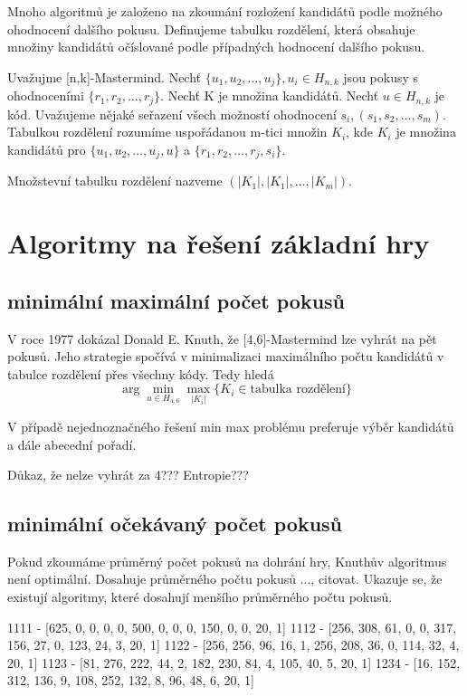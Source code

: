 Mnoho algoritmů je založeno na zkoumání rozložení kandidátů podle možného ohodnocení dalšího pokusu. Definujeme tabulku rozdělení, která obsahuje množiny kandidátů očíslované podle případných hodnocení dalšího pokusu. 
\begin{definice}\label{def01:2}
  Uvažujme [n,k]-Mastermind. \hfill \break Nechť $\{u_1, u_2, \dots, u_j\}, u_i \in H_{n,k}$ jsou pokusy s ohodnoceními $\{r_1, r_2, \dots, r_j\}$. Nechť K je množina kandidátů. Nechť $u \in H_{n,k}$ je kód. Uvažujeme nějaké seřazení všech možností ohodnocení $s_i, (s_1, s_2, \dots, s_m)$. Tabulkou rozdělení rozumíme uspořádanou m-tici množin $K_i$, kde $K_i$ je množina kandidátů pro $\{u_1, u_2, \dots, u_j, u\}$ a $\{r_1, r_2, \dots, r_j, s_i\}$.

  Množstevní tabulku rozdělení nazveme $(|K_1|, |K_1|, \dots, |K_m|)$.
\end{definice}



\section{Algoritmy na řešení základní hry}
\subsection{minimální maximální počet pokusů}
V roce 1977 dokázal Donald E. Knuth, že [4,6]-Mastermind lze vyhrát na pět pokusů.\cite{donald_e__knuth_1977} Jeho strategie spočívá v minimalizaci maximálního počtu kandidátů v tabulce rozdělení přes všechny kódy. Tedy hledá 
\[ \arg\min_{u \in H_{4,6}} \max_{|K_i|} \{ K_i \in \textrm{tabulka rozdělení}\} \]

V případě nejednoznačného řešení min max problému preferuje výběr kandidátů a dále abecední pořadí. 

Důkaz, že nelze vyhrát za 4??? Entropie???

\subsection{minimální očekávaný počet pokusů}
Pokud zkoumáme průměrný počet pokusů na dohrání hry, Knuthův algoritmus není optimální. Dosahuje průměrného počtu pokusů ..., citovat. Ukazuje se, že existují algoritmy, které dosahují menšího průměrného počtu pokusů.


1111 - [625, 0, 0, 0, 0, 500, 0, 0, 0, 150, 0, 0, 20, 1]
1112 - [256, 308, 61, 0, 0, 317, 156, 27, 0, 123, 24, 3, 20, 1]
1122 - [256, 256, 96, 16, 1, 256, 208, 36, 0, 114, 32, 4, 20, 1]
1123 - [81, 276, 222, 44, 2, 182, 230, 84, 4, 105, 40, 5, 20, 1]
1234 - [16, 152, 312, 136, 9, 108, 252, 132, 8, 96, 48, 6, 20, 1]



